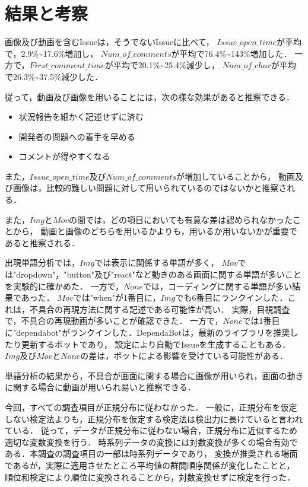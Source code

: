 \section{結果と考察\label{research}}

画像及び動画を含むIssueは，そうでないIssueに比べて，
$Issue\_open\_time$が平均で，2.9\%\textasciitilde17.6\%増加し，
$Num\_of\_comments$が平均で76.4\%\textasciitilde143\%増加した．
一方で，$First\_comment\_time$が平均で20.1\%\textasciitilde25.4\%減少し，
$Num\_of\_char$が平均で26.3\%\textasciitilde 37.5\%減少した．

従って，動画及び画像を用いることには，次の様な効果があると推察できる．
\begin{itemize}
  \item 状況報告を細かく記述せずに済む
  \item 開発者の問題への着手を早める
  \item コメントが得やすくなる
\end{itemize}
また，$Issue\_open\_time$及び$Num\_of\_comments$が増加していることから，
動画及び画像は，比較的難しい問題に対して用いられているのではないかと推察される．

また，$Img$と$Mov$の間では，どの項目においても有意な差は認められなかったことから，
動画と画像のどちらを用いるかよりも，用いるか用いないかが重要であると推察される．

出現単語分析では，$Img$では表示に関係する単語が多く，
$Mov$では"dropdown"，"button"及び"react"など動きのある画面に関する単語が多いことを実験的に確かめた．
一方で，$None$では，コーディングに関する単語が多い結果であった．
$Mov$では"when"が1番目に，$Img$でも6番目にランクインした．これは，不具合の再現方法に関する記述である可能性が高い．
実際，目視調査で，不具合の再現動画が多いことが確認できた．
一方で，$None$では1番目に"dependabot"がランクインした．DependaBotは，最新のライブラリを推奨したり更新するボットであり，
設定により自動でIssueを生成することもある．
$Img$及び$Mov$と$None$の差は，ボットによる影響を受けている可能性がある．

単語分析の結果から，不具合が画面に関する場合に画像が用いられ，画面の動きに関する場合に動画が用いられ易いと推察できる．

今回，すべての調査項目が正規分布に従わなかった．
一般に，正規分布を仮定しない検定法よりも，正規分布を仮定する検定法は検出力に長けていると言われている．
従って，データが正規分布に従わない場合，正規分布に近似するため適切な変数変換を行う．
時系列データの変換には対数変換が多くの場合有効である．本調査の調査項目の一部は時系列データであり，
変換が推奨される場面であるが，実際に適用させたところ平均値の群間順序関係が変化したことと，
順位和検定により順位に変換されることから，対数変換せずに検定を行った．

